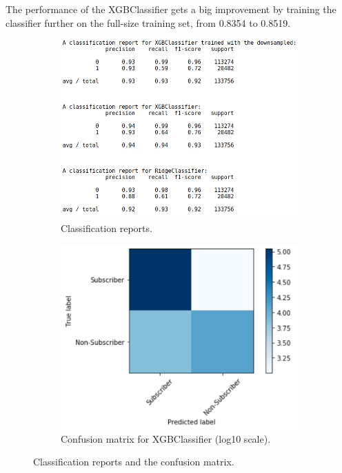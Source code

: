 \documentclass[a4paper]{article}
\begin{document}
			The performance of the XGBClassifier gets a big improvement by training the classifier further on the full-size training set, from 0.8354 to 0.8519. 
			
			\begin{figure}
				\begin{subfigure}[b]{0.57\textwidth}
					\includegraphics[width=1\textwidth]{ClassificationReports.png}
					\caption{\label{fig:cls_report}Classification reports.}
				\end{subfigure}					
				\begin{subfigure}[b]{0.43\textwidth}
					\centering
					\includegraphics[width=1\textwidth]{ConfusionMatrix.png}\caption{\label{fig:confusion_matrix}Confusion matrix for XGBClassifier (log10 scale).}	
				\end{subfigure}
				\caption{Classification reports and the confusion matrix.}
				\label{fig:confusion_report}
			\end{figure}	
			
\end{document}
